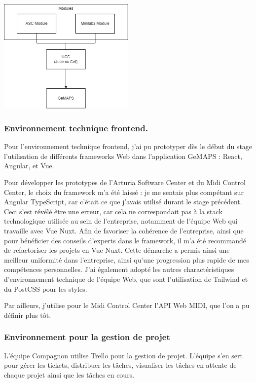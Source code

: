 \documentclass[francais]{rapportPFE}  %
\begin{document}
\begin{center}
	\centering
	\includegraphics[width=0.5\textwidth]{graphics/gmaps.png}
	\begin{tiny}
	\end{tiny}
	\label{fig}
\end{center}

\subsubsection{Environnement technique frontend.}

Pour l'environnement technique frontend, j'ai pu prototyper dès le début du stage l'utilisation de différents frameworks Web dans l'application GeMAPS : React, Angular, et Vue.  

Pour développer les prototypes de l'Arturia Software Center et du Midi Control Center, le choix du framework m'a été laissé : je me sentais plus compétant sur Angular TypeScript, car c'était ce que j'avais utilisé durant le stage précédent. Ceci s'est révélé être une erreur, car cela ne correspondait pas à la stack technologique utilisée au sein de l'entreprise, notamment de l'équipe Web qui travaille avec Vue Nuxt. Afin de favoriser la cohérence de l'entreprise, ainsi que pour bénéficier des conseils d'experts dans le framework, il m'a été recommandé de refactoriser les projets en Vue Nuxt. Cette démarche a permis ainsi une meilleur uniformité dans l'entreprise, ainsi qu'une progression plus rapide de mes compétences personnelles. J'ai également adopté les autres charactéristiques d'environnement technique de l'équipe Web, que sont l'utilisation de Tailwind et du PostCSS pour les styles. 

Par ailleurs, j'utilise pour le Midi Control Center l'API Web MIDI, que l'on a pu définir plus tôt. 

\subsubsection{Environnement pour la gestion de projet}
L'équipe Compagnon utilise Trello pour la gestion de projet. L'équipe s'en sert pour gérer les tickets, distribuer les tâches, visualiser les tâches en attente de chaque projet ainsi que les tâches en cours.
\end{document}
